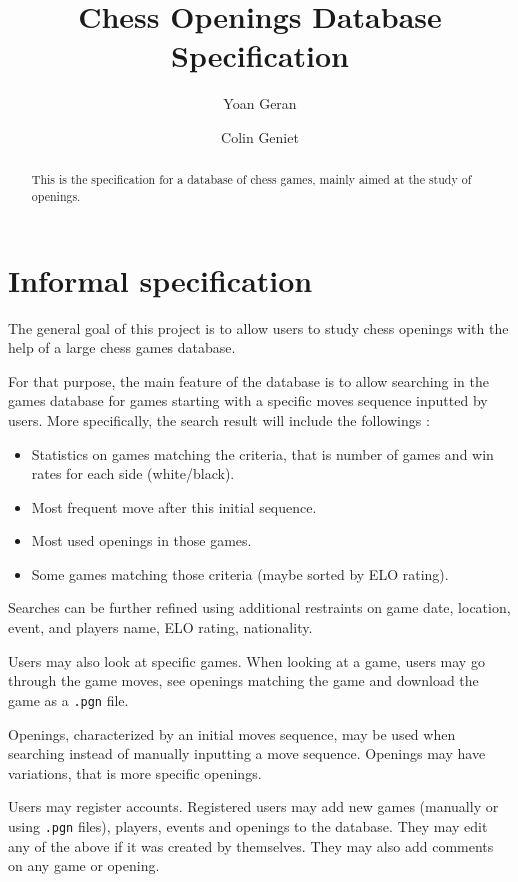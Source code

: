 \documentclass{article}
\begin{document}
\title{Chess Openings Database Specification}
\author{Yoan Geran \and Colin Geniet}
\maketitle

\begin{abstract}
This is the specification for a database of chess games, mainly aimed at
the study of openings.
\end{abstract}

\tableofcontents

\section{Informal specification}
The general goal of this project is to allow users to study chess openings
with the help of a large chess games database.

For that purpose, the main feature of the database is to allow searching
in the games database for games starting with a specific moves sequence
inputted by users.
More specifically, the search result will include the followings :
\begin{itemize}
\item Statistics on games matching the criteria, that is number of games and
win rates for each side (white/black).
\item Most frequent move after this initial sequence.
\item Most used openings in those games.
\item Some games matching those criteria (maybe sorted by ELO rating).
\end{itemize}

Searches can be further refined using additional restraints on game date, location,
event, and players name, ELO rating, nationality.

Users may also look at specific games.
When looking at a game, users may go through the game moves,
see openings matching the game and download the game as a \verb|.pgn| file.

Openings, characterized by an initial moves sequence, may be used when searching
instead of manually inputting a move sequence.
Openings may have variations, that is more specific openings.

Users may register accounts. Registered users may add new games (manually or using \verb|.pgn| files),
players, events and openings to the database. They may edit any of the above if it was
created by themselves. They may also add comments on any game or opening.
\end{document}
